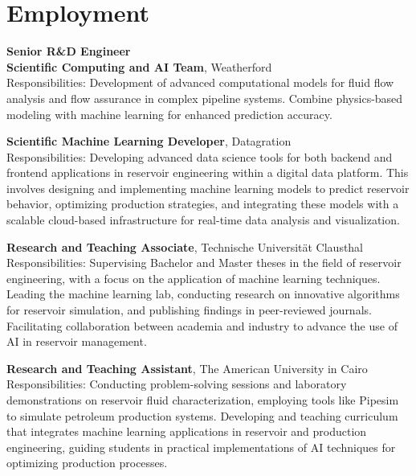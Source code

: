 \documentclass[a4paper,10pt]{article}
\begin{document}
\section*{Employment}
\begin{description}[style=nextline, leftmargin=0.5cm]
 \item[Sep 2024 - Present] \textbf{Senior R\&D Engineer\\ Scientific Computing and AI Team}, Weatherford \\
    Responsibilities: Development of advanced computational models for fluid flow analysis and flow assurance in complex pipeline systems. Combine physics-based modeling with machine learning for enhanced prediction accuracy. 
    \item[Feb 2021 - Aug 2024] \textbf{Scientific Machine Learning Developer}, Datagration \\
    Responsibilities: Developing advanced data science tools for both backend and frontend applications in reservoir engineering within a digital data platform. This involves designing and implementing machine learning models to predict reservoir behavior, optimizing production strategies, and integrating these models with a scalable cloud-based infrastructure for real-time data analysis and visualization.
    
    \item[Feb 2021 - Dec 2023] \textbf{Research and Teaching Associate}, Technische Universität Clausthal\\
    Responsibilities: Supervising Bachelor and Master theses in the field of reservoir engineering, with a focus on the application of machine learning techniques. Leading the machine learning lab, conducting research on innovative algorithms for reservoir simulation, and publishing findings in peer-reviewed journals. Facilitating collaboration between academia and industry to advance the use of AI in reservoir management.
    
    \item[Jan 2019 - Feb 2021] \textbf{Research and Teaching Assistant}, The American University in Cairo \\
    Responsibilities: Conducting problem-solving sessions and laboratory demonstrations on reservoir fluid characterization, employing tools like Pipesim to simulate petroleum production systems. Developing and teaching curriculum that integrates machine learning applications in reservoir and production engineering, guiding students in practical implementations of AI techniques for optimizing production processes.
    

\end{description}
\end{document}
